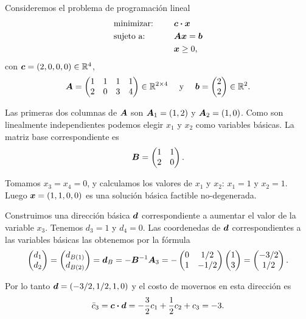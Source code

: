 \begin{example}
\label{ex:simplex}
Consideremos el problema de programación lineal
\begin{alignat*}{2}
  & \text{minimizar: } & & \bm{c} \boldsymbol{\cdot} \bm{x} \\
   & \text{sujeto a: } & \quad & \bm{A}\bm{x} = \bm{b} \\
   & & & \bm{x} \ge 0,
\end{alignat*}
con $\bm{c} = (2, 0, 0, 0) \in \mathbb{R}^4$,
$$
\bm{A} = \begin{pmatrix}
1 & 1 & 1 & 1 \\
2 & 0 & 3 & 4
\end{pmatrix} \in \mathbb{R}^{2 \times 4}
\quad \text{ y } \quad \bm{b} = \begin{pmatrix} 2 \\ 2 \end{pmatrix} \in \mathbb{R}^2.
$$

Las primeras dos columnas de $\bm{A}$ son $\bm{A}_1 = (1,2)$ y $\bm{A}_2 = (1, 0)$. Como son linealmente independientes podemos elegir $x_1$ y $x_2$ como variables básicas. La matriz base correspondiente es
$$
\bm{B} = \begin{pmatrix} 1 & 1 \\ 2 & 0 \end{pmatrix}.
$$

Tomamos $x_3 = x_4 = 0$, y calculamos los valores de $x_1$ y $x_2$: $x_1 = 1$ y $x_2 = 1$. Luego $\bm{x} = (1, 1, 0, 0)$ es una solución básica factible no-degenerada.

Construimos una dirección básica $\bm{d}$ correspondiente a aumentar el valor de la variable $x_3$. Tenemos $d_3 = 1$ y $d_4 = 0$. Las coordenedas de $\bm{d}$ correspondientes a las variables básicas las obtenemos por la fórmula
$$
\begin{pmatrix} d_1 \\ d_2 \end{pmatrix} =
\begin{pmatrix} d_{B(1)} \\ d_{B(2)} \end{pmatrix} =
\bm{d}_B = -\bm{B}^{-1} \bm{A}_3 =
-\begin{pmatrix} 0 & 1/2 \\ 1 & -1/2 \end{pmatrix}
\begin{pmatrix} 1 \\ 3 \end{pmatrix} =
\begin{pmatrix} -3/2 \\ 1/2 \end{pmatrix}.
$$

Por lo tanto $\bm{d} = (-3/2, 1/2, 1, 0)$ y el costo de movernos en esta dirección es
$$\bar c_3 = \bm{c} \boldsymbol{\cdot} \bm{d} = -\frac{3}{2} c_1 + \frac{1}{2}c_2 + c_3 = -3.$$
\end{example}


